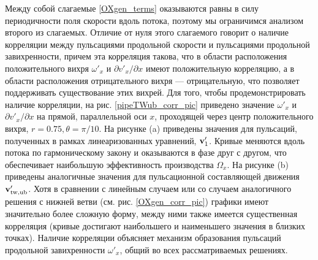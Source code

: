 Между собой слагаемые \eqref{OXgen_terms} оказываются равны в силу периодичности поля скорости вдоль потока, поэтому мы ограничимся анализом второго из слагаемых. Отличие от нуля этого слагаемого говорит о наличие корреляции между пульсациями продольной скорости и пульсациями продольной завихренности, причем эта корреляция такова, что в области расположения положительного вихря $\omega'_x$ и ${\partial v'_x}/{\partial x}$ имеют положительную корреляцию, а в области расположения отрицательного вихря --- отрицательную, что позволяет поддерживать существование этих вихрей. Для того, чтобы продемонстрировать наличие корреляции, на рис. \ref{pipeTWub_corr_pic} приведено значение $\omega'_x$ и ${\partial v'_x}/{\partial x}$ на прямой, параллельной оси $x$, проходящей через центр положительного вихря, $r = 0.75, \theta = \pi/10$. На рисунке (a) приведены значения для пульсаций, полученных в рамках линеаризованных уравнений, $\mathbf{v}'_1$. Кривые меняются вдоль потока по гармоническому закону и оказываются в фазе друг с другом, что обеспечивает наибольшую эффективность производства $\Omega_x$. На рисунке (b) приведены аналогичные значения для пульсационной составляющей движения $\mathbf{v}'_\mathrm{tw,ub}$. Хотя в сравнении с линейным случаем или со случаем аналогичного решения с нижней ветви (см. рис. \ref{OXgen_corr_pic}) графики имеют значительно более сложную форму, между ними также имеется существенная корреляция (кривые достигают наибольшего и наименьшего значения в близких точках). Наличие корреляции объясняет механизм образования пульсаций продольной завихренности $\omega'_x$, общий во всех рассматриваемых решениях.


